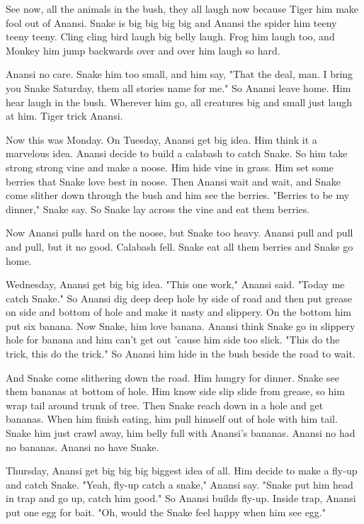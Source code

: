 See now, all the animals in the bush, they all laugh now because Tiger him make fool out of Anansi. Snake is big big big big and Anansi the spider him teeny teeny teeny. Cling cling bird laugh big belly laugh. Frog him laugh too, and Monkey him jump backwards over and over him laugh so hard.

Anansi no care. Snake him too small, and him say, "That the deal, man. I bring you Snake Saturday, them all stories name for me." So Anansi leave home. Him hear laugh in the bush. Wherever him go, all creatures big and small just laugh at him. Tiger trick Anansi.

Now this was Monday. On Tuesday, Anansi get big idea. Him think it a marvelous idea. Anansi decide to build a calabash to catch Snake. So him take strong strong vine and make a noose. Him hide vine in grass. Him set some berries that Snake love best in noose. Then Anansi wait and wait, and Snake come slither down through the bush and him see the berries. "Berries to be my dinner," Snake say. So Snake lay across the vine and eat them berries.

Now Anansi pulls hard on the noose, but Snake too heavy. Anansi pull and pull and pull, but it no good. Calabash fell. Snake eat all them berries and Snake go home.

Wednesday, Anansi get big big idea. "This one work," Anansi said. "Today me catch Snake." So Anansi dig deep deep hole by side of road and then put grease on side and bottom of hole and make it nasty and slippery. On the bottom him put six banana. Now Snake, him love banana. Anansi think Snake go in slippery hole for banana and him can't get out 'cause him side too slick. "This do the trick, this do the trick." So Anansi him hide in the bush beside the road to wait.

And Snake come slithering down the road. Him hungry for dinner. Snake see them bananas at bottom of hole. Him know side slip slide from grease, so him wrap tail around trunk of tree. Then Snake reach down in a hole and get bananas. When him finish eating, him pull himself out of hole with him tail. Snake him just crawl away, him belly full with Anansi's bananas. Anansi no had no bananas. Anansi no have Snake.

Thursday, Anansi get big big big biggest idea of all. Him decide to make a fly-up and catch Snake. "Yeah, fly-up catch a snake," Anansi say. "Snake put him head in trap and go up, catch him good." So Anansi builds fly-up. Inside trap, Anansi put one egg for bait. "Oh, would the Snake feel happy when him see egg."

